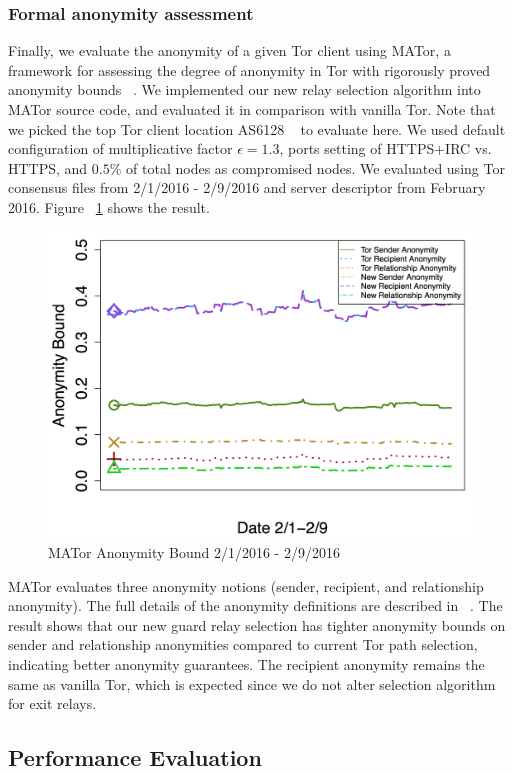 \subsubsection{Formal anonymity assessment}
Finally, we evaluate the anonymity of a given Tor client using MATor, a framework for assessing the degree of anonymity in Tor with rigorously proved anonymity bounds ~\cite{backes2014nothing}. We implemented our new relay selection algorithm into MATor source code, and evaluated it in comparison with vanilla Tor. Note that we picked the top Tor client location AS6128 ~\cite{juen2012protecting} to evaluate here. We used default configuration of multiplicative factor $\epsilon=1.3$, ports setting of HTTPS+IRC vs. HTTPS, and $0.5\%$ of total nodes as compromised nodes. We evaluated using Tor consensus files from 2/1/2016 - 2/9/2016 and server descriptor from February 2016. Figure ~\ref{fig_mator} shows the result. 

\begin{figure}[ht!]
\centering
\includegraphics[width=.4\textwidth]{figure/mator}
\caption{MATor Anonymity Bound 2/1/2016 - 2/9/2016\label{fig_mator}}
\end{figure}

MATor evaluates three anonymity notions (sender, recipient, and relationship anonymity). The full details of the anonymity definitions are described in ~\cite{backes2014nothing}. The result shows that our new guard relay selection has tighter anonymity bounds on sender and relationship anonymities compared to current Tor path selection, indicating better anonymity guarantees. The recipient anonymity remains the same as vanilla Tor, which is expected since we do not alter selection algorithm for exit relays. 




\subsection{Performance Evaluation}

